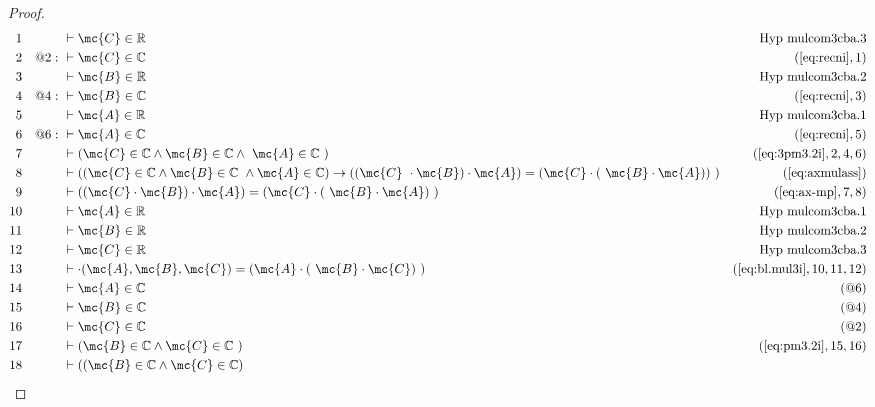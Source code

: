 \begin{proof}
\begin{align}
  1 &&  & \vdash \mc{C} \in
\mathbb{R}&\text{Hyp~mulcom3cba.3}\notag%
  \\ 2 && @2:\  & \vdash \mc{C} \in \mathbb{C}&(\mbox{\ref{eq:recni}},1)\notag
  \\ 3 &&  & \vdash \mc{B} \in
\mathbb{R}&\text{Hyp~mulcom3cba.2}\notag%
  \\ 4 && @4:\  & \vdash \mc{B} \in \mathbb{C}&(\mbox{\ref{eq:recni}},3)\notag
  \\ 5 &&  & \vdash \mc{A} \in
\mathbb{R}&\text{Hyp~mulcom3cba.1}\notag%
  \\ 6 && @6:\  & \vdash \mc{A} \in \mathbb{C}&(\mbox{\ref{eq:recni}},5)\notag
  \\ 7 &&  & \vdash ( \mc{C} \in \mathbb{C} \wedge \mc{B} \in \mathbb{C} \wedge
     ~\mc{A} \in \mathbb{C}
     ~)&(\mbox{\ref{eq:3pm3.2i}},2,4,6)\notag
  \\ 8 &&  & \vdash ( ( \mc{C} \in \mathbb{C} \wedge \mc{B} \in \mathbb{C}
     ~\wedge \mc{A} \in \mathbb{C} ) \rightarrow ( ( \mc{C}
     ~\cdot \mc{B} ) \cdot \mc{A} ) = ( \mc{C} \cdot (
     ~\mc{B} \cdot \mc{A} ) )
     ~)&(\mbox{\ref{eq:axmulass}})\notag
  \\ 9 &&  & \vdash ( ( \mc{C} \cdot \mc{B} ) \cdot \mc{A} ) = ( \mc{C} \cdot (
     ~\mc{B} \cdot \mc{A} )
     ~)&(\mbox{\ref{eq:ax-mp}},7,8)\notag
  \\ 10 &&  & \vdash \mc{A} \in
\mathbb{R}&\text{Hyp~mulcom3cba.1}\notag%
  \\ 11 &&  & \vdash \mc{B} \in
\mathbb{R}&\text{Hyp~mulcom3cba.2}\notag%
  \\ 12 &&  & \vdash \mc{C} \in
\mathbb{R}&\text{Hyp~mulcom3cba.3}\notag%
  \\ 13 &&  & \vdash \cdot( \mc{A} , \mc{B} , \mc{C} ) = ( \mc{A} \cdot (
     ~\mc{B} \cdot \mc{C} )
     ~)&(\mbox{\ref{eq:bl.mul3i}},10,11,12)\notag
  \\ 14 &&  & \vdash \mc{A} \in \mathbb{C}&(@6)\notag
  \\ 15 &&  & \vdash \mc{B} \in \mathbb{C}&(@4)\notag
  \\ 16 &&  & \vdash \mc{C} \in \mathbb{C}&(@2)\notag
  \\ 17 &&  & \vdash ( \mc{B} \in \mathbb{C} \wedge \mc{C} \in \mathbb{C}
     ~)&(\mbox{\ref{eq:pm3.2i}},15,16)\notag
  \\ 18 &&  & \vdash ( ( \mc{B} \in \mathbb{C} \wedge \mc{C} \in \mathbb{C} )

\end{align}
\end{proof}
